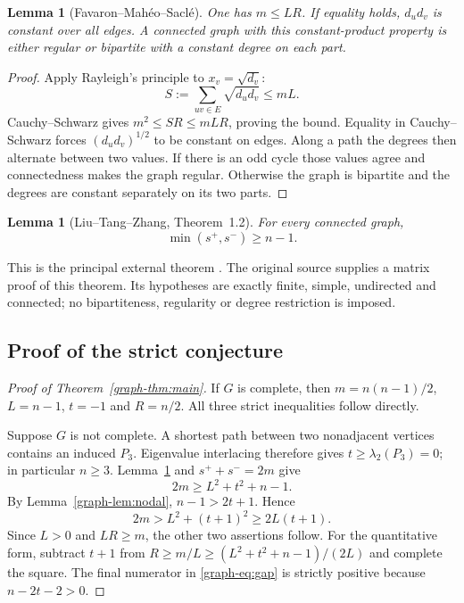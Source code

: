 \documentclass[11pt,a4paper]{article}
\newtheorem{lemma}[theorem]{Lemma}
\theoremstyle{remark}\newtheorem{remark}[theorem]{Remark}
\numberwithin{equation}{section}
\begin{document}
\begin{lemma}[Favaron--Mah\'eo--Sacl\'e]\label{graph-lem:fav}
One has $m\le LR$. If equality holds, $d_ud_v$ is constant over all
edges. A connected graph with this constant-product property is either
regular or bipartite with a constant degree on each part.
\end{lemma}
\begin{proof}
Apply Rayleigh's principle to $x_v=\sqrt{d_v}$:
\[
 S:=\sum_{uv\in E}\sqrt{d_ud_v}\le mL.
\]
Cauchy--Schwarz gives $m^2\le SR\le mLR$, proving the bound.
Equality in Cauchy--Schwarz forces $(d_ud_v)^{1/2}$ to be constant
on edges. Along a path the degrees then alternate between two values.
If there is an odd cycle those values agree and connectedness makes
the graph regular. Otherwise the graph is bipartite and the degrees
are constant separately on its two parts.
\end{proof}

\begin{lemma}[Liu--Tang--Zhang, Theorem~1.2]\label{graph-lem:energy}
For every connected graph,
\[
                  \min(s^+,s^-)\ge n-1.
\]
\end{lemma}
This is the principal external theorem \cite{graph-LTZ}.
The original source supplies a matrix proof of this theorem. Its
hypotheses are exactly
finite, simple, undirected and connected; no bipartiteness,
regularity or degree restriction is imposed.

\subsection{Proof of the strict conjecture}
\begin{proof}[Proof of Theorem~\ref{graph-thm:main}]
If $G$ is complete, then $m=n(n-1)/2$, $L=n-1$, $t=-1$ and $R=n/2$.
All three strict inequalities follow directly.

Suppose $G$ is not complete. A shortest path between two nonadjacent
vertices contains an induced $P_3$. Eigenvalue interlacing therefore
gives $t\ge\lambda_2(P_3)=0$; in particular $n\ge3$.
Lemma~\ref{graph-lem:energy} and $s^++s^-=2m$ give
\begin{equation}\label{graph-eq:twoenergy}
                2m\ge L^2+t^2+n-1.
\end{equation}
By Lemma~\ref{graph-lem:nodal}, $n-1>2t+1$. Hence
\[
 2m>L^2+(t+1)^2\ge2L(t+1).
\]
Since $L>0$ and $LR\ge m$, the other two assertions follow.
For the quantitative form, subtract $t+1$ from
$R\ge m/L\ge(L^2+t^2+n-1)/(2L)$ and complete the square.
The final numerator in \eqref{graph-eq:gap} is strictly positive because
$n-2t-2>0$.
\end{proof}
\end{document}

